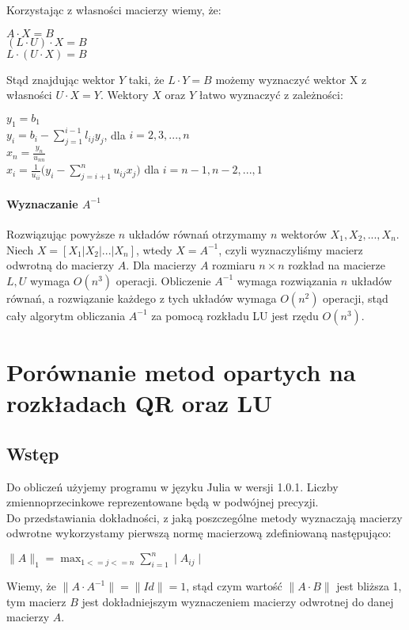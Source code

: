 \documentclass[11pt]{article}
\begin{document}
Korzystając z własności macierzy wiemy, że:
\begin{center}
$A \cdot X = B$ \\
$(L \cdot U) \cdot X = B$ \\
$L \cdot (U \cdot X) = B$
\end{center}
Stąd znajdując wektor $Y$ taki, że $L \cdot Y = B$ możemy wyznaczyć wektor X z własności $U \cdot X = Y$. Wektory $X$ oraz $Y$ łatwo wyznaczyć z zależności:
\begin{center}
$y_{1} = b_{1}$\\
\vspace{0.4em} $y_{i} = b_{i} - \sum_{j=1}^{i-1} l_{ij} y_{j}$, dla $i = 2,3,...,n$\\
\vspace{0.5em} $x_{n} = \frac{y_{n}}{u_{nn}}$\\
\vspace{0.4em} $x_{i} = \frac{1}{u_{ii}} \Big( y_{i} - \sum_{j=i+1}^{n} u_{ij} x_{j} \Big)$ dla $i = n-1,n-2,...,1$
\end{center}

\paragraph{Wyznaczanie $A^{-1}$}
Rozwiązując powyższe $n$ układów równań otrzymamy $n$ wektorów $X_{1}, X_{2},..., X_{n}$. Niech $X = [ X_{1} \vert X_{2} \vert ... \vert X_{n} ]$, wtedy $X = A^{-1}$, czyli wyznaczyliśmy macierz odwrotną do macierzy $A$. Dla macierzy $A$ rozmiaru $n \times n$ rozkład na macierze $L, U$ wymaga $O(n^{3})$ operacji. Obliczenie $A^{-1}$ wymaga rozwiązania $n$ układów równań, a rozwiązanie każdego z tych układów wymaga $O(n^{2})$ operacji, stąd cały algorytm obliczania $A^{-1}$ za pomocą rozkładu LU jest rzędu $O(n^{3})$.

\section{Porównanie metod opartych na rozkładach QR oraz LU}

\subsection{Wstęp}

Do obliczeń użyjemy programu w języku Julia w wersji 1.0.1. Liczby zmiennoprzecinkowe reprezentowane będą w podwójnej precyzji.\\
Do przedstawiania dokładności, z jaką poszczególne metody wyznaczają macierzy odwrotne wykorzystamy pierwszą normę macierzową zdefiniowaną następująco:
\begin{center}
\begin{math}
\| A \|_{1} = \max_{1<=j<=n} \sum_{i=1}^{n} \mid A_{ij} \mid
\end{math}
\end{center}
Wiemy, że $ \| A \cdot A^{-1} \| = \| Id \| = 1$, stąd czym wartość $\| A \cdot B \|$ jest bliższa 1, tym macierz $B$ jest dokładniejszym wyznaczeniem macierzy odwrotnej do danej macierzy $A$.
\end{document}
